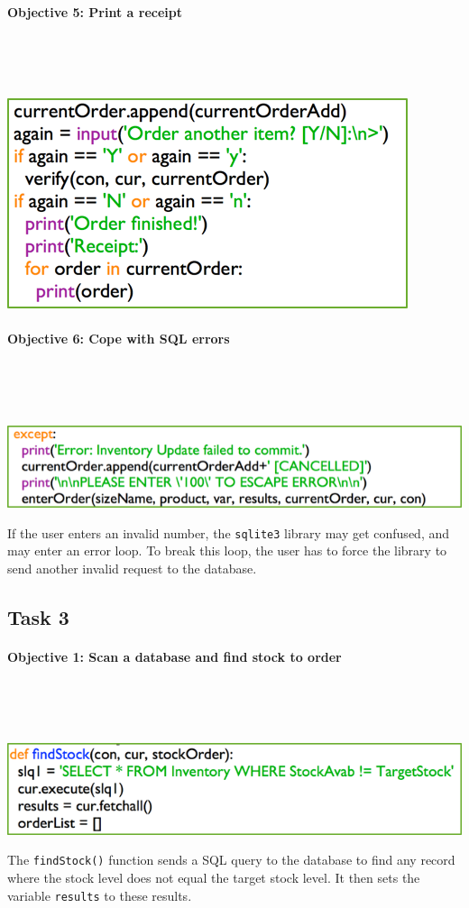 \documentclass[a4paper]{article}
\begin{document}
\paragraph{Objective 5: Print a receipt} ~\par ~\par
\noindent\includegraphics{task2_obj5_1.png} \par 
\paragraph{Objective 6: Cope with SQL errors} ~\par ~\par
\noindent\includegraphics{task2_obj6_1.png} \par
If the user enters an invalid number, the \verb|sqlite3| library may get confused, and may enter an error loop. To break this loop, the user has to force the library to send another invalid request to the database.

\newpage
\subsection{Task 3}
\paragraph{Objective 1: Scan a database and find stock to order} ~\par ~\par
\noindent\includegraphics{task3_obj1_1.png} \par 
The \verb|findStock()| function sends a SQL query to the database to find any record where the stock level does not equal the target stock level. It then sets the variable \verb?results? to these results.
\end{document}
